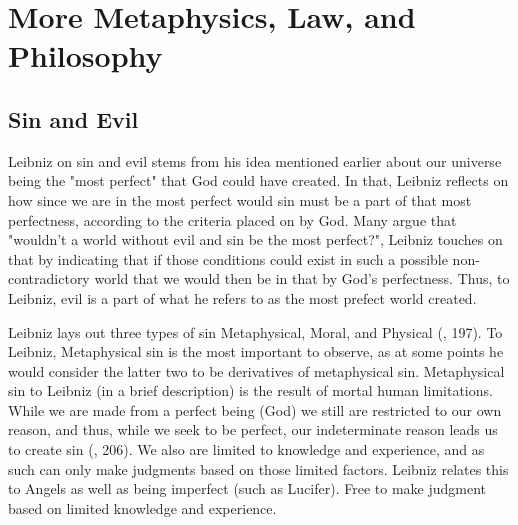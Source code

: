 \documentclass[12pt]{report}
\begin{document}
\chapter{More Metaphysics, Law, and Philosophy}
    
\section*{Sin and Evil}
Leibniz on sin and evil stems from his idea mentioned earlier about our universe being the "most perfect" that God could have created.
In that, Leibniz reflects on how since we are in the most perfect would sin must be a part of that most perfectness, according to the criteria placed on by God.
Many argue that "wouldn't a world without evil and sin be the most perfect?", Leibniz touches on that by indicating that if those conditions could exist in such a possible non-contradictory world that we would then be in that by God's perfectness.
Thus, to Leibniz, evil is a part of what he refers to as the most prefect world created.\\ \par
Leibniz lays out three types of sin Metaphysical, Moral, and Physical (, 197).
To Leibniz, Metaphysical sin is the most important to observe, as at some points he would consider the latter two to be derivatives of metaphysical sin.
Metaphysical sin to Leibniz (in a brief description) is the result of mortal human limitations.
While we are made from a perfect being (God) we still are restricted to our own reason, and thus, while we seek to be perfect, our indeterminate reason leads us to create sin (, 206).
We also are limited to knowledge and experience, and as such can only make judgments based on those limited factors. 
Leibniz relates this to Angels as well as being imperfect (such as Lucifer). 
Free to make judgment based on limited knowledge and experience.
\end{document}
